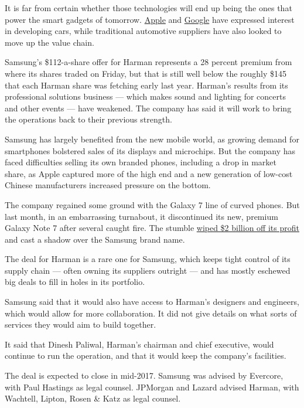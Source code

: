 It is far from certain whether those technologies will end up being the
ones that power the smart gadgets of tomorrow.
\href{http://www.nytimes3xbfgragh.onion/2016/09/10/technology/apple-is-said-to-be-rethinking-strategy-on-self-driving-cars.html}{Apple}
and
\href{http://www.nytimes3xbfgragh.onion/2016/08/06/technology/alphabet-google-autonomous-car-chris-urmson.html}{Google}
have expressed interest in developing cars, while traditional automotive
suppliers have also looked to move up the value chain.

Samsung's \$112-a-share offer for Harman represents a 28 percent premium
from where its shares traded on Friday, but that is still well below the
roughly \$145 that each Harman share was fetching early last year.
Harman's results from its professional solutions business --- which
makes sound and lighting for concerts and other events --- have
weakened. The company has said it will work to bring the operations back
to their previous strength.

Samsung has largely benefited from the new mobile world, as growing
demand for smartphones bolstered sales of its displays and microchips.
But the company has faced difficulties selling its own branded phones,
including a drop in market share, as Apple captured more of the high end
and a new generation of low-cost Chinese manufacturers increased
pressure on the bottom.

The company regained some ground with the Galaxy 7 line of curved
phones. But last month, in an embarrassing turnabout, it discontinued
its new, premium Galaxy Note 7 after several caught fire. The stumble
\href{http://www.nytimes3xbfgragh.onion/2016/10/28/business/samsung-galaxy-note-7-profit.html}{wiped
\$2 billion off its profit} and cast a shadow over the Samsung brand
name.

The deal for Harman is a rare one for Samsung, which keeps tight control
of its supply chain --- often owning its suppliers outright --- and has
mostly eschewed big deals to fill in holes in its portfolio.

Samsung said that it would also have access to Harman's designers and
engineers, which would allow for more collaboration. It did not give
details on what sorts of services they would aim to build together.

It said that Dinesh Paliwal, Harman's chairman and chief executive,
would continue to run the operation, and that it would keep the
company's facilities.

The deal is expected to close in mid-2017. Samsung was advised by
Evercore, with Paul Hastings as legal counsel. JPMorgan and Lazard
advised Harman, with Wachtell, Lipton, Rosen \& Katz as legal counsel.


